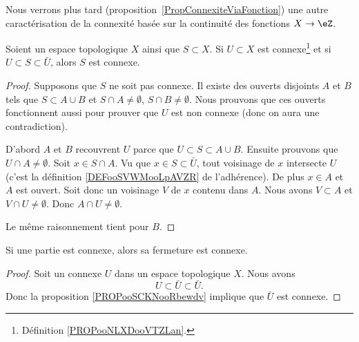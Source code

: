 Nous verrons plus tard (proposition~\ref{PropConnexiteViaFonction}) une autre caractérisation de la connexité basée sur la continuité des fonctions \( X\to \eZ\).



\begin{proposition}     \label{PROPooSCKNooRbewdv}
	Soient un espace topologique \( X\) ainsi que \( S\subset X\). Si \( U\subset X\) est connexe\footnote{Définition \ref{PROPooNLXDooVTZLan}.} et si \( U\subset S\subset \bar U\), alors \( S\) est connexe.
\end{proposition}

\begin{proof}
	Supposons que \( S\) ne soit pas connexe. Il existe des ouverts disjoints \( A\) et \( B\) tels que \( S\subset A\cup B\) et \( S\cap A\neq\emptyset\), \( S\cap B\neq\emptyset\). Nous prouvons que ces ouverts fonctionnent aussi pour prouver que \( U\) est non connexe (donc on aura une contradiction).

	D'abord \( A\) et \( B\) recouvrent \( U\) parce que \( U\subset S\subset A\cup B\). Ensuite prouvons que \( U\cap A\neq \emptyset\). Soit \( x\in S\cap A\). Vu que \( x\in S\subset\bar U\), tout voisinage de \( x\) intersecte \( U\) (c'est la définition \ref{DEFooSVWMooLpAVZR} de l'adhérence). De plus \( x\in A\) et \( A\) est ouvert. Soit donc un voisinage \( V\) de \( x\) contenu dans \( A\). Nous avons \( V\subset A\) et \( V\cap U\neq \emptyset\). Donc \( A\cap U\neq \emptyset\).

	Le même raisonnement tient pour \( B\).
\end{proof}

\begin{proposition}	\label{PROPooOEDKooYeYZQC}
	Si une partie est connexe, alors sa fermeture est connexe.
\end{proposition}

\begin{proof}
	Soit un connexe \( U\) dans un espace topologique \( X\). Nous avons
	\begin{equation}
		U\subset\bar U\subset\bar U.
	\end{equation}
	Donc la proposition \ref{PROPooSCKNooRbewdv} implique que \( \bar U\) est connexe.
\end{proof}


